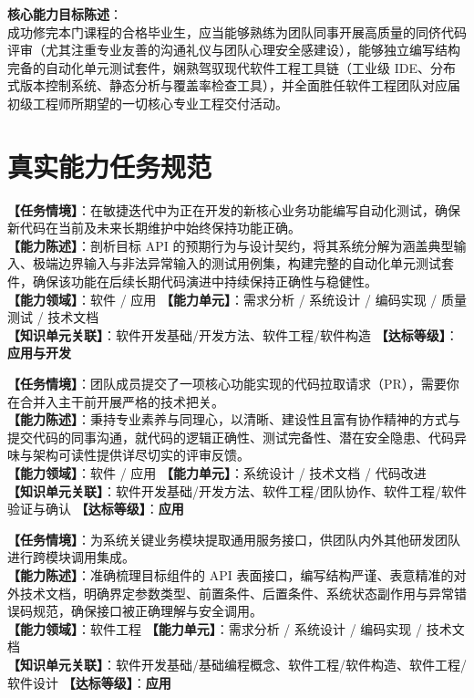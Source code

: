 \textbf{核心能力目标陈述}：\\
成功修完本门课程的合格毕业生，应当能够熟练为团队同事开展高质量的同侪代码评审（尤其注重专业友善的沟通礼仪与团队心理安全感建设），能够独立编写结构完备的自动化单元测试套件，娴熟驾驭现代软件工程工具链（工业级 IDE、分布式版本控制系统、静态分析与覆盖率检查工具），并全面胜任软件工程团队对应届初级工程师所期望的一切核心专业工程交付活动。

\section{真实能力任务规范}

\begin{taskbox}[任务 1：研发中新增业务代码的自动化测试套件构建]
\textbf{【任务情境】}：在敏捷迭代中为正在开发的新核心业务功能编写自动化测试，确保新代码在当前及未来长期维护中始终保持功能正确。\\
\textbf{【能力陈述】}：剖析目标 API 的预期行为与设计契约，将其系统分解为涵盖典型输入、极端边界输入与非法异常输入的测试用例集，构建完整的自动化单元测试套件，确保该功能在后续长期代码演进中持续保持正确性与稳健性。\\
\textbf{【能力领域】}：软件 / 应用 \quad \textbf{【能力单元】}：需求分析 / 系统设计 / 编码实现 / 质量测试 / 技术文档\\
\textbf{【知识单元关联】}：软件开发基础/开发方法、软件工程/软件构造 \quad \textbf{【达标等级】}：\textbf{应用与开发}
\end{taskbox}

\begin{taskbox}[任务 2：为团队同事执行规范化同侪代码评审]
\textbf{【任务情境】}：团队成员提交了一项核心功能实现的代码拉取请求（PR），需要你在合并入主干前开展严格的技术把关。\\
\textbf{【能力陈述】}：秉持专业素养与同理心，以清晰、建设性且富有协作精神的方式与提交代码的同事沟通，就代码的逻辑正确性、测试完备性、潜在安全隐患、代码异味与架构可读性提供详尽切实的评审反馈。\\
\textbf{【能力领域】}：软件 / 应用 \quad \textbf{【能力单元】}：系统设计 / 技术文档 / 代码改进\\
\textbf{【知识单元关联】}：软件开发基础/开发方法、软件工程/团队协作、软件工程/软件验证与确认 \quad \textbf{【达标等级】}：\textbf{应用}
\end{taskbox}

\begin{taskbox}
\textbf{【任务情境】}：为系统关键业务模块提取通用服务接口，供团队内外其他研发团队进行跨模块调用集成。\\
\textbf{【能力陈述】}：准确梳理目标组件的 API 表面接口，编写结构严谨、表意精准的对外技术文档，明确界定参数类型、前置条件、后置条件、系统状态副作用与异常错误码规范，确保接口被正确理解与安全调用。\\
\textbf{【能力领域】}：软件工程 \quad \textbf{【能力单元】}：需求分析 / 系统设计 / 编码实现 / 技术文档\\
\textbf{【知识单元关联】}：软件开发基础/基础编程概念、软件工程/软件构造、软件工程/软件设计 \quad \textbf{【达标等级】}：\textbf{应用}
\end{taskbox}

